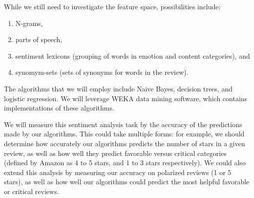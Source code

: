 While we still need to investigate the feature space, possibilities include:
\begin{enumerate}
\item N-grams,
\item parts of speech,
\item sentiment lexicons (grouping of words in emotion and content categories), and
\item synomym-sets (sets of synonyms for words in the review).
\end{enumerate}

The algorithms that we will employ include Naive Bayes, decision trees, and logistic regression.
We will leverage WEKA\cite{weka} data mining software, which contains implementations of these algorithms.

We will measure this sentiment analysis task by the accuracy of the predictions made by our algorithms.
This could take multiple forms: for example, we should determine how accurately our algorithms
predicts the number of stars in a given review, as well as how well they predict favorable versus critical categories
(defined by Amazon as 4 to 5 stars, and 1 to 3 stars respectively). 
We could also extend this analysis by measuring our accuracy on polarized reviews (1 or 5 stars),
as well as how well our algorithms could predict the most helpful favorable or critical reviews.
